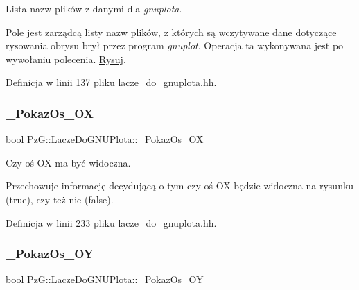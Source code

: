 Lista nazw plików z danymi dla {\itshape gnuplota}. 

Pole jest zarządcą listy nazw plików, z których są wczytywane dane dotyczące rysowania obrysu brył przez program {\itshape gnuplot}. Operacja ta wykonywana jest po wywołaniu polecenia. \hyperlink{class_pz_g_1_1_lacze_do_g_n_u_plota_a065f5b8402737cc62b0ad4f66d028335}{Rysuj}. 

Definicja w linii 137 pliku lacze\+\_\+do\+\_\+gnuplota.\+hh.

\mbox{\label{class_pz_g_1_1_lacze_do_g_n_u_plota_a833aa8994b9913786f920ec8c259731f}} 
\subsubsection{\texorpdfstring{\+\_\+\+Pokaz\+Os\+\_\+\+OX}{\_PokazOs\_OX}}
{\footnotesize\ttfamily bool Pz\+G\+::\+Lacze\+Do\+G\+N\+U\+Plota\+::\+\_\+\+Pokaz\+Os\+\_\+\+OX\hspace{0.3cm}{\ttfamily [protected]}}



Czy oś OX ma być widoczna. 

Przechowuje informację decydującą o tym czy oś OX będzie widoczna na rysunku ({\ttfamily true}), czy też nie ({\ttfamily false}). 

Definicja w linii 233 pliku lacze\+\_\+do\+\_\+gnuplota.\+hh.

\mbox{\label{class_pz_g_1_1_lacze_do_g_n_u_plota_ae8d9b4dac5eae6ce86b7043c45b70ed8}} 
\subsubsection{\texorpdfstring{\+\_\+\+Pokaz\+Os\+\_\+\+OY}{\_PokazOs\_OY}}
{\footnotesize\ttfamily bool Pz\+G\+::\+Lacze\+Do\+G\+N\+U\+Plota\+::\+\_\+\+Pokaz\+Os\+\_\+\+OY\hspace{0.3cm}{\ttfamily [protected]}}



